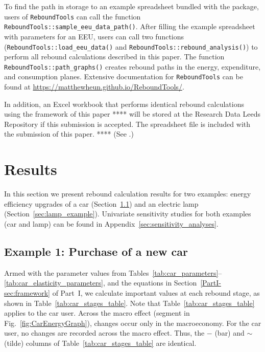 \documentclass[12pt]{article}\usepackage[]{graphicx}\usepackage[]{xcolor}
\begin{document}
To find the path in storage to an example spreadsheet bundled with the package, 
users of \texttt{ReboundTools}
can call the function \texttt{ReboundTools::sample\_eeu\_data\_path()}.
After filling the example spreadsheet with parameters for an EEU, 
users can call two functions
(\texttt{ReboundTools::load\_eeu\_data()} and \texttt{ReboundTools::rebound\_analysis()})
to perform all rebound calculations described in this paper.
The function \texttt{ReboundTools::path\_graphs()} creates 
rebound paths in the energy, expenditure, and consumption planes.
Extensive documentation for \texttt{ReboundTools}
can be found at \url{https://matthewheun.github.io/ReboundTools/}.

In addition, an Excel workbook that performs identical rebound calculations 
using the framework of this paper
**** will be stored at the
Research Data Leeds Repository if this submission is accepted.  
The spreadsheet file is included with the submission of this paper. ****
(See \citet{Brockway:2023aa}.)


\section{Results}
\label{sec:results}

In this section we present rebound calculation results for two examples: 
energy efficiency upgrades of a car (Section~\ref{sec:car_example}) and 
an electric lamp (Section~\ref{sec:lamp_example}). 
Univariate sensitivity studies for both examples (car and lamp) 
can be found in Appendix~\ref{sec:sensitivity_analyses}.


\subsection{Example 1: Purchase of a new car}
\label{sec:car_example}

Armed with the parameter values from 
Tables~\ref{tab:car_parameters}--\ref{tab:car_elasticity_parameters}, 
and the equations in Section~\ref{PartI-sec:framework} of Part~I,
we calculate important values at each rebound stage,
as shown in Table~\ref{tab:car_stages_table}.
Note that Table~\ref{tab:car_stages_table} applies to the car user.
Across the macro effect (segment \bartilde{} in Fig.~\ref{fig:CarEnergyGraph}), 
changes occur only in the macroeconomy.
For the car user, no changes are recorded across the macro effect.
Thus, the $-$ (bar) and $\sim$ (tilde) columns
of Table~\ref{tab:car_stages_table} are identical.
\end{document}
